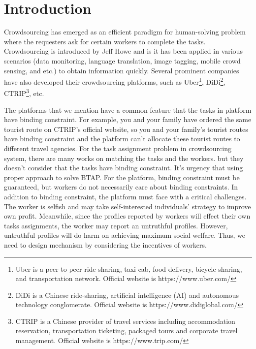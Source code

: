 \section{Introduction}
Crowdsourcing has emerged as an efficient paradigm for human-solving problem where the requesters ask for certain workers to complete the tasks. Crowdsourcing is introduced by Jeff Howe\cite{howe2006rise} and is it has been applied in various scenarios (data monitoring\cite{DBLP:journals/twc/XuXY15}, language translation\cite{ipeirotis2010analyzing}, image tagging\cite{DBLP:conf/aaai/Tran-ThanhHRRJ15}, mobile crowd sensing\cite{DBLP:conf/cscwd/XuHTXLZ18}, and etc.) to obtain information quickly. Several prominent companies have also developed their crowdsourcing platforms, such as Uber\footnote{Uber is a peer-to-peer ride-sharing, taxi cab, food delivery, bicycle-sharing, and transportation network. Official website is https://www.uber.com/}, DiDi\footnote{DiDi is a Chinese ride-sharing, artificial intelligence (AI) and autonomous technology conglomerate. Official website is https://www.didiglobal.com/}, CTRIP\footnote{CTRIP is a Chinese provider of travel services including accommodation reservation, transportation ticketing, packaged tours and corporate travel management. Official website is https://www.trip.com/}, etc.

The  platforms that we mention have a common feature that the tasks in platform have binding constraint. For example, you and your family have ordered the same tourist route on CTRIP's official website, so you and your family's tourist routes have binding constraint and the platform can't allocate these tourist routes to different travel agencies. For the task assignment problem in crowdsourcing system, there are many works\cite{DBLP:conf/wcnc/CuiS0GDYL18}\cite{liu2018reverse}\cite{DBLP:conf/IEEEcloud/QinZL17} on matching the tasks and the workers. but they doesn't consider that the tasks have binding constraint. It's urgency that using proper approach to solve BTAP. For the platform, binding constraint must be guaranteed, but workers do not necessarily care about binding constraints. In addition to binding constraint, the platform must face with a critical challenges. The worker is selfish and may take self-interested individuals’ strategy to improve own profit. Meanwhile, since the profiles reported by workers will effect their own tasks assignments, the worker may report an untruthful profiles. However, untruthful profiles will do harm on achieving maximum social welfare. Thus, we need to design mechanism by considering the incentives of workers.

